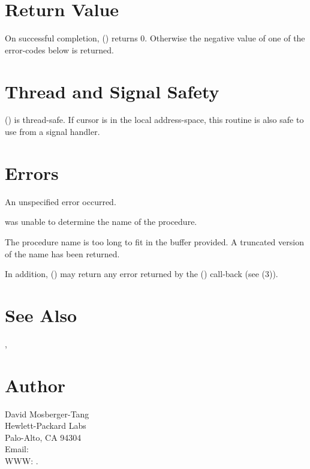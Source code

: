 \documentclass{article}
\begin{document}
\section{Return Value}

On successful completion, () returns 0.
Otherwise the negative value of one of the error-codes below is
returned.

\section{Thread and Signal Safety}

() is thread-safe.  If cursor  is
in the local address-space, this routine is also safe to use from a
signal handler.

\section{Errors}

\begin{Description}
\item[\Const{UNW\_EUNSPEC}] An unspecified error occurred.
\item[\Const{UNW\_ENOINFO}]  was unable to determine
  the name of the procedure.
\item[\Const{UNW\_ENOMME}] The procedure name is too long to fit
  in the buffer provided.  A truncated version of the name has been
  returned.
\end{Description}
In addition, () may return any error
returned by the () call-back (see
(3)).

\section{See Also}

,

\section{Author}

\noindent
David Mosberger-Tang\\
Hewlett-Packard Labs\\
Palo-Alto, CA 94304\\
Email: \\
WWW: .
\LatexManEnd
\end{document}
